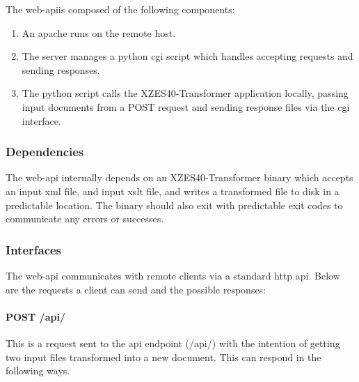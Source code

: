 The \gls{web-api}is composed of the following components:

\begin{enumerate}
  \item  An \gls{apache} runs on the remote host.\cite{apache-server}
  \item The server manages a \gls{python} \gls{cgi} script which handles accepting requests and sending responses.
  \item The \gls{python} script calls the XZES40-Transformer application locally, passing input documents from a POST request and sending response files via the \gls{cgi} interface.
\end{enumerate}

\subsubsection{Dependencies}

The \gls{web-api} internally depends on an XZES40-Transformer binary which accepts an input \gls{xml} file, and input \gls{xslt} file, and writes a transformed file to disk in a predictable location.
The binary should also exit with predictable exit codes to communicate any errors or successes.

\subsubsection{Interfaces}

The \gls{web-api} communicates with remote clients via a standard \gls{http} \gls{api}.
Below are the requests a client can send and the possible responses:

\paragraph{POST /api/}

This is a request sent to the \gls{api} endpoint (/api/) with the intention of getting two input files transformed into a new document.
This can respond in the following ways.

